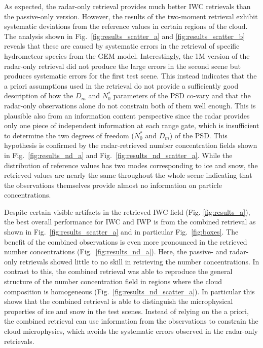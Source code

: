 \documentclass[journal abbreviation, manuscript]{copernicus}
\begin{document}
As expected, the radar-only retrieval provides much better IWC retrievals than
the passive-only version. However, the results of the two-moment retrieval
exhibit systematic deviations from the reference values in certain regions of
the cloud. The analysis shown in Fig.~\ref{fig:results_scatter_a} and
\ref{fig:results_scatter_b} reveals that these are caused by systematic errors
in the retrieval of specific hydrometeor species from the GEM model.
Interestingly, the 1M version of the radar-only retrieval did not produce the
large errors in the second scene but produces systematic errors for the first
test scene. This instead indicates that the a priori assumptions used in the
retrieval do not provide a sufficiently good description of how the $D_m$ and
$N_0^*$ parameters of the PSD co-vary and that the radar-only observations alone
do not constrain both of them well enough. This is plausible also from an
information content perspective since the radar provides only one piece of
independent information at each range gate, which is insufficient to determine
the two degrees of freedom ($N_0^*$ and $D_m$) of the PSD. This hypothesis is
confirmed by the radar-retrieved number concentration fields shown in
Fig.~\ref{fig:results_nd_a} and Fig.~\ref{fig:results_nd_scatter_a}. While the
distribution of reference values has two modes corresponding to ice and snow,
the retrieved values are nearly the same throughout the whole scene indicating
that the observations themselves provide almost no information on particle
concentrations.

Despite certain visible artifacts in the retrieved IWC field (Fig.
\ref{fig:results_a}), the best overall performance for IWC and IWP is from the
combined retrieval as shown in Fig.~\ref{fig:results_scatter_a} and in
particular Fig.~\ref{fig:boxes}. The benefit of the combined observations is
even more pronounced in the retrieved number concentrations
(Fig.~\ref{fig:results_nd_a}). Here, the passive- and radar-only retrievals
showed little to no skill in retrieving the number concentrations. In contrast
to this, the combined retrieval was able to reproduce the general structure of
the number concentration field in regions where the cloud composition is
homogeneous (Fig.~\ref{fig:results_nd_scatter_a}). In particular this shows that
the combined retrieval is able to distinguish the microphysical properties of
ice and snow in the test scenes. Instead of relying on the a priori, the
combined retrieval can use information from the observations to constrain the
cloud microphysics, which avoids the systematic errors observed in the
radar-only retrievals.
\end{document}
